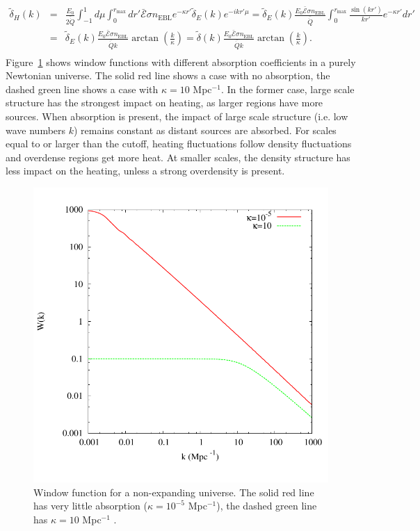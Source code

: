 \documentclass[twocolumns]{emulateapj}
\begin{document}
\begin{eqnarray}
  \label{eq:heat_fluc_newt3}
  \tilde{\delta}_H(k)&=&  
  \frac{E_0}{\bar{2\dot{Q}}} \int_{-1}^{1} d\mu \int_0^{r_{\mathrm{max}}}dr'  \bar{\mathcal{E}}\sigma n_{\mathrm{EBL}} e^{-\kappa r'} \tilde{\delta}_E(k) e^{-ikr'\mu}
  =\tilde{\delta}_E(k)\frac{  E_0 \bar{\mathcal{E}} \sigma n_{\mathrm{EBL}}}{\bar{\dot{Q}}}\int_0^{r_{\mathrm{max}}} \frac{\sin(kr')}{kr'} e^{-\kappa r'}   dr'\\ \nonumber
  &=&\tilde{\delta}_E(k)\frac{  E_0 \bar{\mathcal{E}} \sigma n_{\mathrm{EBL}}}{ \bar{\dot{Q}}k} \arctan\left(\frac{k}{\kappa}\right)
  =\tilde{\delta}(k)\frac{  E_0 \bar{\mathcal{E}} \sigma n_{\mathrm{EBL}}}{ \bar{\dot{Q}}k} \arctan\left(\frac{k}{\kappa}\right).\\ 
\end{eqnarray}
Figure~\ref{fig:window_newt} shows  window functions with different absorption coefficients in a purely Newtonian universe. The solid red line shows a case with no absorption, the dashed green line shows a case with $\kappa=10$ Mpc$^{-1}$.  In the former case, large scale structure has the strongest impact on heating, as larger regions have more sources. When absorption is present,  the impact of large scale structure (i.e. low wave numbers $k$) remains constant as distant sources are absorbed. For scales equal to or larger than the cutoff, heating fluctuations follow density fluctuations and overdense regions get more heat. At smaller scales, the density structure has less impact on the heating, unless a strong overdensity is present.  

\begin{figure}
\centering
\includegraphics[width = .45\textwidth ]{newtonian_window-eps-converted-to}
\caption{Window function for a non-expanding universe. The solid red line has very little absorption ($\kappa=10^{-5}$ Mpc$^{-1}$), the dashed green line has $\kappa=10 $ Mpc$^{-1}$ .}
\label{fig:window_newt}
\end{figure}
\end{document}
